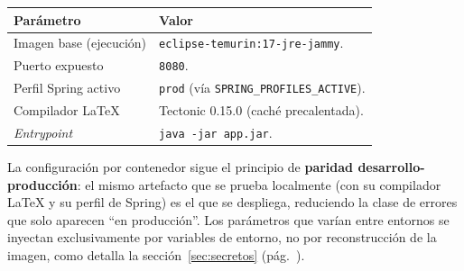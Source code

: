 \vspace{0.2cm}
\noindent
\renewcommand{\arraystretch}{1.3}
\fontsize{8.5}{10.2}\selectfont\sffamily
\begin{tabularx}{\textwidth}{|L{3.6cm}|Y|}
\hline
{}
\sffamily\textbf{Parámetro} & \sffamily\textbf{Valor} \\
\hline
Imagen base (ejecución) & \texttt{eclipse-temurin:17-jre-jammy}. \\ \hline
{}
Puerto expuesto & \texttt{8080}. \\ \hline
Perfil Spring activo & \texttt{prod} (vía \texttt{SPRING\_PROFILES\_ACTIVE}). \\ \hline
{}
Compilador LaTeX & Tectonic 0.15.0 (caché precalentada). \\ \hline
\textit{Entrypoint} & \texttt{java -jar app.jar}. \\ \hline
\end{tabularx}
\label{tab:prod-params}

\begin{AvisoNota}
La configuración por contenedor sigue el principio de \textbf{paridad
desarrollo-producción}: el mismo artefacto que se prueba localmente (con su compilador
LaTeX y su perfil de Spring) es el que se despliega, reduciendo la clase de errores que
solo aparecen ``en producción''. Los parámetros que varían entre entornos se inyectan
exclusivamente por variables de entorno, no por reconstrucción de la imagen, como detalla
la sección~\ref{sec:secretos} (pág.~\pageref{sec:secretos}).
\end{AvisoNota}
